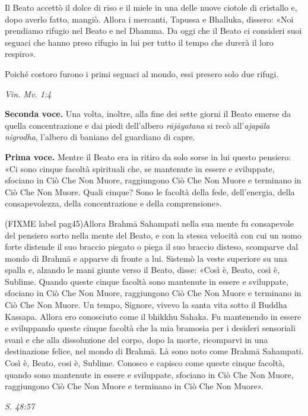 Il Beato accettò il dolce di riso e il miele in una delle nuove ciotole
di cristallo e, dopo averlo fatto, mangiò. Allora i mercanti, Tapussa e
Bhalluka, dissero: «Noi prendiamo rifugio nel Beato e nel Dhamma. Da
oggi che il Beato ci consideri suoi seguaci che hanno preso rifugio in
lui per tutto il tempo che durerà il loro respiro».


Poiché costoro furono i primi seguaci al mondo, essi presero solo due
rifugi.


\emph{Vin. Mv. 1:4}


\textbf{Seconda voce.} Una volta, inoltre, alla fine dei sette giorni il Beato
emerse da quella concentrazione e dai piedi dell’albero \emph{rājāyatana} si
recò all’\emph{ajapāla nigrodha}, l’albero di baniano del guardiano di capre.


\textbf{Prima voce.} Mentre il Beato era in ritiro da solo sorse in lui questo
pensiero: «Ci sono cinque facoltà spirituali che, se mantenute in essere
e sviluppate, sfociano in Ciò Che Non Muore, raggiungono Ciò Che Non
Muore e terminano in Ciò Che Non Muore. Quali cinque? Sono le facoltà
della fede, dell’energia, della consapevolezza, della concentrazione e
della comprensione».


(FIXME label pag45)Allora Brahmā Sahampati nella sua mente fu consapevole del pensiero
sorto nella mente del Beato, e con la stessa velocità con cui un uomo
forte distende il suo braccio piegato o piega il suo braccio disteso,
scomparve dal mondo di Brahmā e apparve di fronte a lui. Sistemò la
veste superiore su una spalla e, alzando le mani giunte verso il Beato,
disse: «Così è, Beato, così è, Sublime. Quando queste cinque facoltà
sono mantenute in essere e sviluppate, sfociano in Ciò Che Non Muore,
raggiungono Ciò Che Non Muore e terminano in Ciò Che Non Muore. Un
tempo, Signore, vivevo la santa vita sotto il Buddha Kassapa. Allora ero
conosciuto come il bhikkhu Sahaka. Fu mantenendo in essere e sviluppando
queste cinque facoltà che la mia bramosia per i desideri sensoriali
svanì e che alla dissoluzione del corpo, dopo la morte, ricomparvi in
una destinazione felice, nel mondo di Brahmā. Là sono noto come Brahmā
Sahampati. Così è, Beato, cosi è, Sublime. Conosco e capisco come queste
cinque facoltà, quando sono mantenute in essere e sviluppate, sfociano
in Ciò Che Non Muore, raggiungono Ciò Che Non Muore e terminano in Ciò
Che Non Muore».


\emph{S. 48:57}


